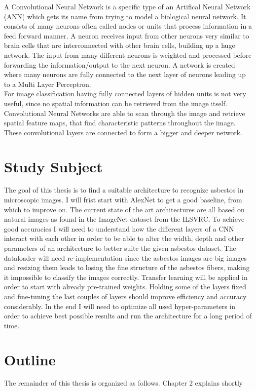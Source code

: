 A Convolutional Neural Network is a specific type of an Artifical Neural Network (ANN) which gets its name from trying to model a biological neural network. It consists of many neurons often called nodes or units that process information in a feed forward manner. A neuron receives input from other neurons very similar to brain cells that are interconnected with other brain cells, building up a huge network. The input from many different neurons is weighted and processed before forwarding the information/output to the next neuron. A network is created where many neurons are fully connected to the next layer of neurons leading up to a Multi Layer Perceptron. \\

For image classification having fully connected layers of hidden units is not very useful, since no spatial information can be retrieved from the image itself. Convolutional Neural Networks are able to scan through the image and retrieve spatial feature maps, that find characteristic patterns throughout the image. These convolutional layers are connected to form a bigger and deeper network.  \\

\section{Study Subject}

The goal of this thesis is to find a suitable architecture to recognize asbestos in microscopic images. I will frist start with AlexNet to get a good baseline, from which to improve on. The current state of the art architectures are all based on natural images as found in the ImageNet dataset from the ILSVRC. To achieve good accuracies I will need to understand how the different layers of a CNN interact with each other in order to be able to alter the width, depth and other parameters of an architecture to better suite the given asbestos dataset. The dataloader will need re-implementation since the asbestos images are big images and resizing them leads to losing the fine structure of the asbestos fibers, making it impossible to classify the images correctly. Transfer learning will be applied in order to start with already pre-trained weights. Holding some of the layers fixed and fine-tuning the last couples of layers should improve efficiency and accuracy considerably. In the end I will need to optimize all used hyper-parameters in order to achieve best possible results and run the architecture for a long period of time.

\section{Outline}

The remainder of this thesis is organized as follows. Chapter 2 explains shortly 
